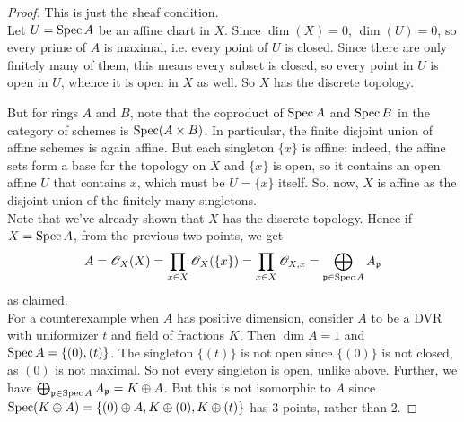\begin{proof}
	This is just the sheaf condition. \\
	
	Let $U = \operatorname{Spec} A$ be an affine chart in $X$. Since $\dim(X)=0$, $\dim(U) = 0$, so every prime of $A$ is maximal, i.e. every point of $U$ is closed. Since there are only finitely many of them, this means every subset is closed, so every point in $U$ is open in $U$, whence it is open in $X$ as well. So $X$ has the discrete topology.
	
	But for rings $A$ and $B$, note that the coproduct of $\operatorname{Spec} A$ and $\operatorname{Spec} B$ in the category of schemes is $\operatorname{Spec}(A \times B)$. In particular, the finite disjoint union of affine schemes is again affine. But each singleton $\{x\}$ is affine; indeed, the affine sets form a base for the topology on $X$ and $\{x\}$ is open, so it contains an open affine $U$ that contains $x$, which must be $U = \{x\}$ itself. So, now, $X$ is affine as the disjoint union of the finitely many singletons. \\
	
	Note that we've already shown that $X$ has the discrete topology. Hence if $X = \operatorname{Spec} A$, from the previous two points, we get
	\[ A = \mathscr{O}_X(X) = \prod_{x \in X} \mathscr{O}_X(\{x\}) = \prod_{x \in X} \mathscr{O}_{X,x} = \bigoplus_{\mathfrak{p} \in \operatorname{Spec} A} A_{\mathfrak{p}} \]
	as claimed. \\
	
	For a counterexample when $A$ has positive dimension, consider $A$ to be a DVR with uniformizer $t$ and field of fractions $K$. Then $\dim A = 1$ and $\operatorname{Spec} A = \{ (0),(t) \}$. The singleton $\{(t)\}$ is not open since $\{(0)\}$ is not closed, as $(0)$ is not maximal. So not every singleton is open, unlike above. Further, we have $\bigoplus_{\mathfrak{p} \in \operatorname{Spec} A} A_{\mathfrak{p}} =  K \oplus A$. But this is not isomorphic to $A$ since $\operatorname{Spec}(K \oplus A) = \{(0) \oplus A, K \oplus (0), K \oplus (t)\}$ has 3 points, rather than 2.
\end{proof}
